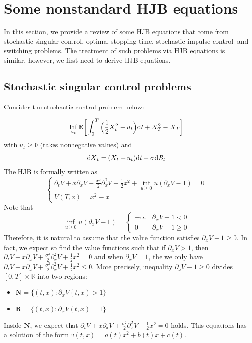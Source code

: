 \documentclass[11pt]{book}
\newcommand{\dd}{\text{\normalfont d}}
\newcommand{\dt}{\text{\normalfont d}t}
\newcommand{\dX}{\text{\normalfont d}X}
\begin{document}
\section{Some nonstandard HJB equations}
In this section, we provide a review of some HJB equations that come from stochastic singular control, optimal stopping time, stochastic impulse control, and switching problems. The treatment of such problems via HJB equations is similar, however, we first need to derive HJB equations. 
\subsection{Stochastic singular control problems}
Consider the stochastic control problem below:
\begin{eg}
    \begin{equation}
        \inf_{u_t}\mathbb{E}\bigg[\int_0^T\Big(\frac12 X_t^2 - u_t\Big){\dt}+ X_T^2- X_T\bigg]
    \end{equation}
    with $u_t\ge0$ (takes nonnegative values) and 
    \begin{equation}
        {\dX}_t=(X_t+u_t){{\dt}}+\sigma {\dd}B_t
    \end{equation}
    The HJB  is formally written as 
    \begin{equation}
        \begin{cases}
            \partial_t V + x\partial_x V + \frac{\sigma^2}{2}\partial^2_{x} V + \frac12x^2 + \inf_{u\ge0} u(\partial_x V-1)=0\\
            V(T,x)=x^2-x
        \end{cases}
    \end{equation}
    Note that 
    \begin{equation}
        \inf_{u\ge0} u(\partial_x V-1)=
        \begin{cases}
            -\infty & \partial_x V-1<0\\
            0 & \partial_x V-1\ge0
        \end{cases}
    \end{equation}
    Therefore, it is natural to assume that the value function satisfies $\partial_x V-1\ge0$. In fact, we expect so find the value functions such that if $\partial_x V>1$, then $\partial_t V + x\partial_x V + \frac{\sigma^2}{2}\partial^2_{x} V + \frac12x^2=0$ and when $\partial_x V=1$, the we only have $\partial_t V + x\partial_x V + \frac{\sigma^2}{2}\partial^2_{x} V + \frac12x^2\le 0$. More precisely, inequality $\partial_x V-1\ge0$ divides $[0,T]\times\mathbb{R}$ into two regions: 
    \begin{itemize}
        \item $\mathbf{N} = \{(t,x): \partial_x V(t,x)>1\}$
        \item $\mathbf{R} = \{(t,x): \partial_x V(t,x)=1\}$
    \end{itemize}
Inside $\mathbf{N}$, we expect that $\partial_t V + x\partial_x V + \frac{\sigma^2}{2}\partial^2_{x} V + \frac12x^2=0$ holds. This equations has a solution of the form $v(t,x)=a(t)x^2+b(t)x+c(t)$. 


\end{eg}
\end{document}
